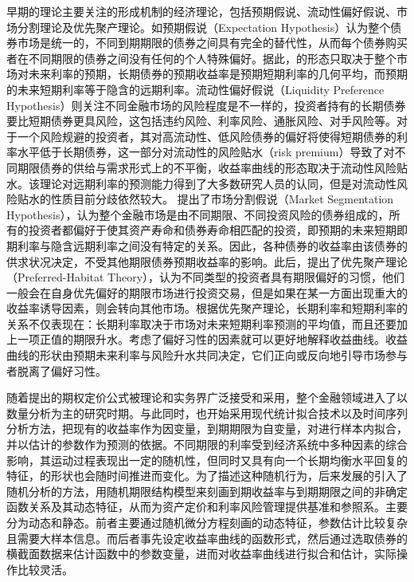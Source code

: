 早期的\ts{}理论主要关注\ts 的形成机制的经济理论，包括预期假说、流动性偏好假说、市场分割理论及优先聚产理论。如预期假说（Expectation Hypothesis）认为整个债券市场是统一的，不同到期期限的债券之间具有完全的替代性，从而每个债券购买者在不同期限的债券之间没有任何的个人特殊偏好。据此，\ts 的形态只取决于整个市场对未来利率的预期，长期债券的预期收益率是预期短期利率的几何平均，而预期的未来短期利率等于\yc 隐含的远期利率。流动性偏好假说（Liquidity Preference Hypothesis）则关注不同金融市场的风险程度是不一样的，投资者持有的长期债券要比短期债券更具风险，这包括违约风险、利率风险、通胀风险、对手风险等。对于一个风险规避的投资者，其对高流动性、低风险债券的偏好将使得短期债券的利率水平低于长期债券，这一部分对流动性的风险贴水（risk premium）导致了对不同期限债券的供给与需求形式上的不平衡，收益率曲线的形态取决于流动性风险贴水。该理论对远期利率的预测能力得到了大多数研究人员的认同，但是对流动性风险贴水的性质目前分歧依然较大。 提出了市场分割假说（Market Segmentation Hypothesis），认为整个金融市场是由不同期限、不同投资风险的债券组成的，所有的投资者都偏好于使其资产寿命和债券寿命相匹配的投资，即预期的未来短期即期利率与隐含远期利率之间没有特定的关系。因此，各种债券的收益率由该债券的供求状况决定，不受其他期限债券预期收益率的影响。此后，提出了优先聚产理论（Preferred-Habitat Theory），认为不同类型的投资者具有期限偏好的习惯，他们一般会在自身优先偏好的期限市场进行投资交易，但是如果在某一方面出现重大的收益率诱导因素，则会转向其他市场。根据优先聚产理论，长期利率和短期利率的关系不仅表现在：长期利率取决于市场对未来短期利率预测的平均值，而且还要加上一项正值的期限升水。考虑了偏好习性的因素就可以更好地解释收益曲线。收益曲线的形状由预期未来利率与风险升水共同决定，它们正向或反向地引导市场参与者脱离了偏好习性。

随着提出的期权定价公式被理论和实务界广泛接受和采用，整个金融领域进入了以数量分析为主的研究时期。与此同时，\tsm 也开始采用现代统计拟合技术以及时间序列分析方法，把现有的收益率作为因变量，到期期限为自变量，对\yc 进行样本内拟合，并以估计的参数作为预测的依据。不同期限的利率受到经济系统中多种因素的综合影响，其运动过程表现出一定的随机性，但同时又具有向一个长期均衡水平回复的特征，\yc 的形状也会随时间推进而变化。为了描述这种随机行为，后来发展的\tsm 引入了随机分析的方法，用随机期限结构模型来刻画到期收益率与到期期限之间的非确定函数关系及其动态特征，从而为资产定价和利率风险管理提供基准和参照系。\tsm 主要分为动态\tsm 和静态\tsm{}。前者主要通过随机微分方程刻画\tsm 的动态特征，参数估计比较复杂且需要大样本信息。而后者事先设定收益率曲线的函数形式，然后通过选取债券的横截面数据来估计函数中的参数变量，进而对收益率曲线进行拟合和估计，实际操作比较灵活。

